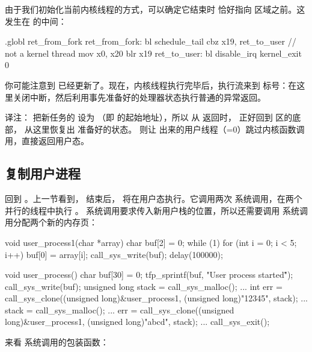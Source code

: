 由于我们初始化当前内核线程的方式，可以确定它结束时  恰好指向  区域之前。这发生在  的中间：

\begin{asmcode}
.globl ret_from_fork
ret_from_fork:
	bl	schedule_tail
	cbz	x19, ret_to_user			// not a kernel thread
	mov	x0, x20
	blr	x19
ret_to_user:
	bl disable_irq
	kernel_exit 0
\end{asmcode}

你可能注意到  已经更新了。现在，内核线程执行完毕后，执行流来到  标号：在这里关闭中断，然后利用事先准备好的处理器状态执行普通的异常返回。

\begin{remark}
  译注： 把新任务的  设为 （即  的起始地址），所以  从  返回时， 正好回到  区的底部， 从这里恢复出  准备好的状态。 则让  出来的用户线程（=0）跳过内核函数调用，直接返回用户态。
\end{remark}

\subsection{复制用户进程}

回到 。上一节看到， 结束后， 将在用户态执行。它调用两次  系统调用，在两个并行的线程中执行 。 系统调用要求传入新用户栈的位置，所以还需要调用  系统调用分配两个新的内存页：

\begin{ccode}
void user_process1(char *array)
{
	char buf[2] = {0};
	while (1){
		for (int i = 0; i < 5; i++){
			buf[0] = array[i];
			call_sys_write(buf);
			delay(100000);
		}
	}
}

void user_process(){
	char buf[30] = {0};
	tfp_sprintf(buf, "User process started\n\r");
	call_sys_write(buf);
	unsigned long stack = call_sys_malloc();
	...
	int err = call_sys_clone((unsigned long)&user_process1, (unsigned long)"12345", stack);
	...
	stack = call_sys_malloc();
	...
	err = call_sys_clone((unsigned long)&user_process1, (unsigned long)"abcd", stack);
	...
	call_sys_exit();
}
\end{ccode}

来看  系统调用的包装函数：


